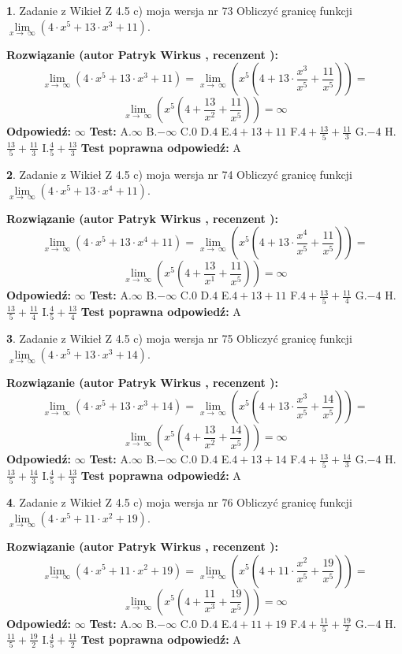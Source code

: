 \documentclass[12pt, a4paper]{article}
\theoremstyle{definition} %
\newtheorem{zad}{}
\newcommand{\zadStart}[1]{\begin{zad}#1\newline}
\newcommand{\zadStop}{\end{zad}}
\newcommand{\rozwStart}[2]{\noindent \textbf{Rozwiązanie (autor #1 , recenzent #2): }\newline}
\newcommand{\rozwStop}{\newline}
\newcommand{\odpStart}{\noindent \textbf{Odpowiedź:}\newline}
\newcommand{\odpStop}{\newline}
\newcommand{\testStart}{\noindent \textbf{Test:}\newline}
\newcommand{\testStop}{\newline}
\newcommand{\kluczStart}{\noindent \textbf{Test poprawna odpowiedź:}\newline}
\newcommand{\kluczStop}{\newline}
\begin{document}
\zadStart{Zadanie z Wikieł Z 4.5 c) moja wersja nr 73}
Obliczyć granicę funkcji  $\lim\limits_{x\to\ \infty}(4 \cdot x^{5}+13 \cdot x^{3}+11)$.
\zadStop
\rozwStart{Patryk Wirkus}{}
$$\lim\limits_{x\to\ \infty}(4 \cdot x^{5}+13 \cdot x^{3}+11) = \lim\limits_{x\to\ \infty}(x^{5}(4 +13 \cdot \frac{x^{3}}{x^{5}}+\frac{11}{x^{5}})) =$$ $$\lim\limits_{x\to\ \infty}(x^{5}(4 +\frac{13}{x^{2}}+\frac{11}{x^{5}})) =\infty$$
\rozwStop
\odpStart
$\infty$
\odpStop
\testStart
A.$\infty$ B.$-\infty$ C.$0$ D.$4$ E.$4 + 13 + 11$
F.$4+\frac{13}{5}+\frac{11}{3}$ G.$-4$
H.$\frac{13}{5}+\frac{11}{3}$
I.$\frac{4}{5}+\frac{13}{3}$
\testStop
\kluczStart
A
\kluczStop



\zadStart{Zadanie z Wikieł Z 4.5 c) moja wersja nr 74}
Obliczyć granicę funkcji  $\lim\limits_{x\to\ \infty}(4 \cdot x^{5}+13 \cdot x^{4}+11)$.
\zadStop
\rozwStart{Patryk Wirkus}{}
$$\lim\limits_{x\to\ \infty}(4 \cdot x^{5}+13 \cdot x^{4}+11) = \lim\limits_{x\to\ \infty}(x^{5}(4 +13 \cdot \frac{x^{4}}{x^{5}}+\frac{11}{x^{5}})) =$$ $$\lim\limits_{x\to\ \infty}(x^{5}(4 +\frac{13}{x^{1}}+\frac{11}{x^{5}})) =\infty$$
\rozwStop
\odpStart
$\infty$
\odpStop
\testStart
A.$\infty$ B.$-\infty$ C.$0$ D.$4$ E.$4 + 13 + 11$
F.$4+\frac{13}{5}+\frac{11}{4}$ G.$-4$
H.$\frac{13}{5}+\frac{11}{4}$
I.$\frac{4}{5}+\frac{13}{4}$
\testStop
\kluczStart
A
\kluczStop



\zadStart{Zadanie z Wikieł Z 4.5 c) moja wersja nr 75}
Obliczyć granicę funkcji  $\lim\limits_{x\to\ \infty}(4 \cdot x^{5}+13 \cdot x^{3}+14)$.
\zadStop
\rozwStart{Patryk Wirkus}{}
$$\lim\limits_{x\to\ \infty}(4 \cdot x^{5}+13 \cdot x^{3}+14) = \lim\limits_{x\to\ \infty}(x^{5}(4 +13 \cdot \frac{x^{3}}{x^{5}}+\frac{14}{x^{5}})) =$$ $$\lim\limits_{x\to\ \infty}(x^{5}(4 +\frac{13}{x^{2}}+\frac{14}{x^{5}})) =\infty$$
\rozwStop
\odpStart
$\infty$
\odpStop
\testStart
A.$\infty$ B.$-\infty$ C.$0$ D.$4$ E.$4 + 13 + 14$
F.$4+\frac{13}{5}+\frac{14}{3}$ G.$-4$
H.$\frac{13}{5}+\frac{14}{3}$
I.$\frac{4}{5}+\frac{13}{3}$
\testStop
\kluczStart
A
\kluczStop



\zadStart{Zadanie z Wikieł Z 4.5 c) moja wersja nr 76}
Obliczyć granicę funkcji  $\lim\limits_{x\to\ \infty}(4 \cdot x^{5}+11 \cdot x^{2}+19)$.
\zadStop
\rozwStart{Patryk Wirkus}{}
$$\lim\limits_{x\to\ \infty}(4 \cdot x^{5}+11 \cdot x^{2}+19) = \lim\limits_{x\to\ \infty}(x^{5}(4 +11 \cdot \frac{x^{2}}{x^{5}}+\frac{19}{x^{5}})) =$$ $$\lim\limits_{x\to\ \infty}(x^{5}(4 +\frac{11}{x^{3}}+\frac{19}{x^{5}})) =\infty$$
\rozwStop
\odpStart
$\infty$
\odpStop
\testStart
A.$\infty$ B.$-\infty$ C.$0$ D.$4$ E.$4 + 11 + 19$
F.$4+\frac{11}{5}+\frac{19}{2}$ G.$-4$
H.$\frac{11}{5}+\frac{19}{2}$
I.$\frac{4}{5}+\frac{11}{2}$
\testStop
\kluczStart
A
\kluczStop
\end{document}
